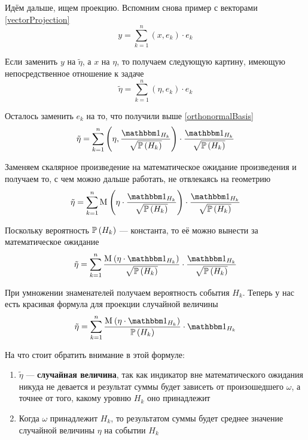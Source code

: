 Идём дальше, ищем проекцию.
Вспомним снова пример с векторами \eqref{vectorProjection}
$$y = \sum_{k=1}^n \left( x, e_k \right) \cdot e_k$$

Если заменить $y$ на $\tilde{\eta}$, а $x$ на $\eta$,
то получаем следующую картину, имеющую непосредственное отношение к задаче
$$\tilde{\eta} = \sum_{k=1}^n \left( \eta, e_k \right) \cdot e_k$$

Осталось заменить $e_k$ на то, что получили выше \eqref{orthonormalBasis}
$$\tilde{\eta}
    = \sum_{k=1}^n
        \left( \eta, \frac{\indicatorof{H_k}}{\sqrt{\probability{H_k}}} \right) 
        \cdot \frac{\indicatorof{H_k}}{\sqrt{\probability{H_k}}}$$

Заменяем скалярное произведение на математическое ожидание произведения
и получаем то, с чем можно дальше работать, не отвлекаясь на геометрию
$$\tilde{\eta}
    = \sum_{k=1}^n
        \mean{\left( \eta
            \cdot \frac{\indicatorof{H_k}}{\sqrt{\probability{H_k}}} \right)}
        \cdot \frac{\indicatorof{H_k}}{\sqrt{\probability{H_k}}}$$

Поскольку вероятность $\mathbb{P}\left( H_k \right)$ --- константа,
то её можно вынести за математическое ожидание
$$\tilde{\eta}
    = \sum_{k=1}^n
        \frac{\mean{\left( \eta \cdot \indicatorof{H_k} \right)}}
            {\sqrt{\probability{H_k}}}
        \cdot \frac{\indicatorof{H_k}}{\sqrt{\probability{H_k}}}$$

При умножении знаменателей получаем вероятность события $H_k$.
Теперь у нас есть красивая формула для проекции случайной величины
\begin{equation}\label{discreteConditionalExpectation}
    \tilde{\eta} = \sum_{k=1}^n
        \frac{\mean{\left( \eta \cdot \indicatorof{H_k} \right)}}
            {\probability{H_k}}
        \cdot \indicatorof{H_k}
\end{equation}

На что стоит обратить внимание в этой формуле:
\begin{enumerate}
    \item $\tilde{\eta}$ --- \textbf{случайная величина},
        так как индикатор вне математического ожидания никуда не девается
        и результат суммы будет зависеть от произошедшего $\omega$,
        а точнее от того, какому уровню $H_k$ оно принадлежит
    \item Когда $\omega$ принадлежит $H_k$,
        то результатом суммы будет среднее значение случайной величины $\eta$
        на событии $H_k$
\end{enumerate}

